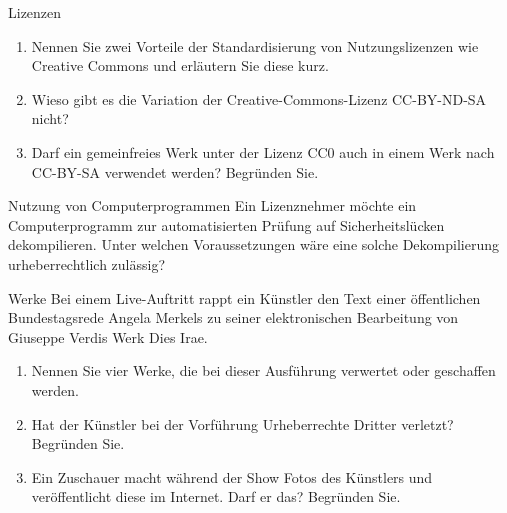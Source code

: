 \documentclass{article}
\begin{document}
\begin{exercise}{Lizenzen}
  \begin{enumerate}
    \item Nennen Sie zwei Vorteile der Standardisierung von Nutzungslizenzen wie Creative Commons und erläutern Sie diese kurz.
    \item Wieso gibt es die Variation der Creative-Commons-Lizenz CC-BY-ND-SA nicht?
    \item Darf ein gemeinfreies Werk unter der Lizenz CC0 auch in einem Werk nach CC-BY-SA verwendet werden? Begründen Sie.
  \end{enumerate}
\end{exercise}

\begin{exercise}{Nutzung von Computerprogrammen}
  Ein Lizenznehmer möchte ein Computerprogramm zur automatisierten Prüfung auf Sicherheitslücken dekompilieren. Unter welchen Voraussetzungen wäre eine solche Dekompilierung urheberrechtlich zulässig?
\end{exercise}

\begin{exercise}{Werke}
  Bei einem Live-Auftritt rappt ein Künstler den Text einer öffentlichen Bundestagsrede Angela Merkels zu seiner elektronischen Bearbeitung von Giuseppe Verdis Werk Dies Irae.
  \begin{enumerate}
    \item Nennen Sie vier Werke, die bei dieser Ausführung verwertet oder geschaffen werden.
    \item Hat der Künstler bei der Vorführung Urheberrechte Dritter verletzt? Begründen Sie.
    \item Ein Zuschauer macht während der Show Fotos des Künstlers und veröffentlicht diese im Internet. Darf er das? Begründen Sie.
  \end{enumerate}
\end{exercise}
\end{document}
